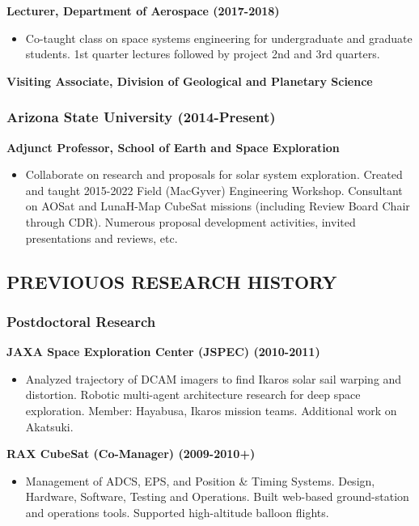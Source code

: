\documentclass[11pt,letterpaper]{article}
\begin{document}
\textbf{Lecturer, Department of Aerospace (2017-2018)}
\begin{itemize}
\item Co-taught class on space systems engineering for undergraduate and graduate students. 1st quarter lectures followed by project 2nd and 3rd quarters.
\end{itemize}

\textbf{Visiting Associate, Division of Geological and Planetary Science}

\subsubsection*{Arizona State University (2014-Present)}
\textbf{Adjunct Professor, School of Earth and Space Exploration}
\begin{itemize}
\item Collaborate on research and proposals for solar system exploration. Created and taught 2015-2022 Field (MacGyver) Engineering Workshop. Consultant on AOSat and LunaH-Map CubeSat missions (including Review Board Chair through CDR). Numerous proposal development activities, invited presentations and reviews, etc.
\end{itemize}

\subsection*{PREVIOUOS RESEARCH HISTORY}
\subsubsection*{Postdoctoral Research}
\textbf{JAXA Space Exploration Center (JSPEC) (2010-2011)}
\begin{itemize}
\item Analyzed trajectory of DCAM imagers to find Ikaros solar sail warping and distortion. Robotic multi-agent architecture research for deep space exploration. Member: Hayabusa, Ikaros mission teams. Additional work on Akatsuki.
\end{itemize}

\textbf{RAX CubeSat (Co-Manager) (2009-2010+)}
\begin{itemize}
\item Management of ADCS, EPS, and Position \& Timing Systems. Design, Hardware, Software, Testing and Operations. Built web-based ground-station and operations tools. Supported high-altitude balloon flights.
\end{itemize}
\end{document}
